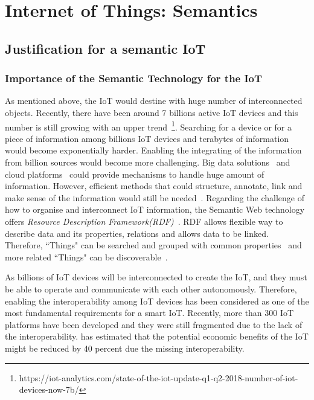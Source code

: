 \chapter{Internet of Things: Semantics}

\section{Justification for a semantic IoT}

\subsection{Importance of the Semantic Technology for the IoT}
\label{ss:stiot}

As mentioned above, the IoT would destine with huge number of interconnected objects.
Recently, there have been around 7 billions active IoT devices and this number is still growing with an upper trend~\footnote{https://iot-analytics.com/state-of-the-iot-update-q1-q2-2018-number-of-iot-devices-now-7b/}.
Searching for a device or for a piece of information among billions IoT devices and terabytes of information would become exponentially harder.
Enabling the integrating of the information from billion sources would become more challenging.
Big data solutions~\citep{Chen:2014} and cloud platforms~\citep{Botta:2016} could provide mechanisms to handle huge amount of information.
However, efficient methods that could structure, annotate, link and make sense of the information would still be needed~\citep{Barnaghi:2012}.
Regarding the challenge of how to organise and interconnect IoT information, the Semantic Web technology offers \textit{Resource Description Framework(RDF)}~\citep{Lassila:1999}.
RDF allows flexible way to describe data and its properties, relations and allows data to be linked.
Therefore, ``Things" can be searched and grouped with common properties~\citep{Chun:2015} and more related ``Things" can be discoverable~\citep{Serena:2017}.

As billions of IoT devices will be interconnected to create the IoT, and they must be able to operate and communicate with each other autonomously.
Therefore, enabling the interoperability among IoT devices has been considered as one of the most fundamental requirements for a smart IoT.
Recently, more than 300 IoT platforms have been developed and they were still fragmented due to the lack of the interoperability.
\cite{Manyika:2015} has estimated that the potential economic benefits of the IoT might be reduced by 40 percent due the missing interoperability.

